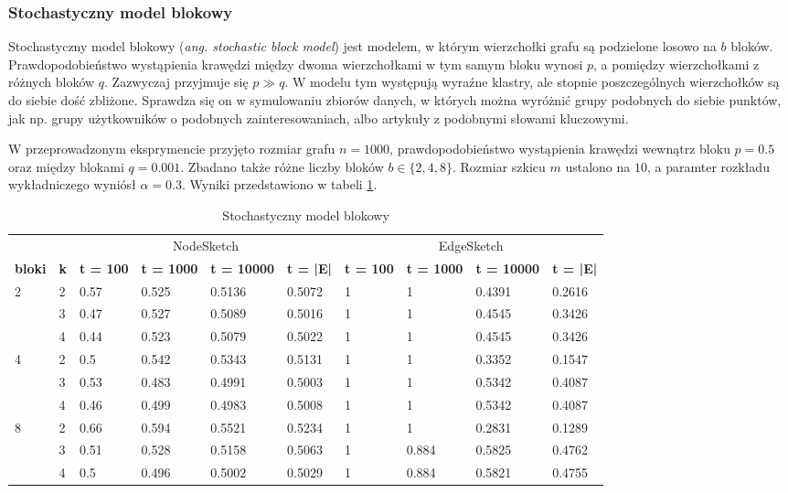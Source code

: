     \subsubsection{Stochastyczny model blokowy}
    Stochastyczny model blokowy (\emph{ang. stochastic block model}) jest modelem, w którym wierzchołki grafu są podzielone losowo na $b$ bloków. Prawdopodobieństwo wystąpienia krawędzi między dwoma wierzchołkami w tym samym bloku wynosi $p$, a pomiędzy wierzchołkami z różnych bloków $q$. Zazwyczaj przyjmuje się $p \gg q$. W modelu tym występują wyraźne klastry, ale stopnie poszczególnych wierzchołków są do siebie dość zbliżone. Sprawdza się on w symulowaniu zbiorów danych, w których można wyróżnić grupy podobnych do siebie punktów, jak np. grupy użytkowników o podobnych zainteresowaniach, albo artykuły z podobnymi słowami kluczowymi. 

    W przeprowadzonym eksprymencie przyjęto rozmiar grafu $n = 1000$, prawdopodobieństwo wystąpienia krawędzi wewnątrz bloku $p = 0.5$ oraz między blokami $q = 0.001$. Zbadano także różne liczby bloków $b \in \{2,4,8\}$. Rozmiar szkicu $m$ ustalono na $10$, a paramter rozkładu wykładniczego wyniósł $\alpha = 0.3$. Wyniki przedstawiono w tabeli \ref{tab:stochastic_block_model}.

    \begin{table}[!ht]
        \small
        \centering
        \begin{tabular}{|l|l|l|l|l|l|l|l|l|l|}
        \hline
            & & \multicolumn{4}{c|}{NodeSketch} & \multicolumn{4}{c|}{EdgeSketch} \\ \cline{1-10}
            \textbf{bloki} & \textbf{k} & \textbf{t = 100} & \textbf{t = 1000} & \textbf{t = 10000} & \textbf{t = |E|} & \textbf{t = 100} & \textbf{t = 1000} & \textbf{t = 10000} & \textbf{t = |E|} \\ \hline\hline
            \multirow{3}{*}{2} & 2 & 0.57 & 0.525 & 0.5136 & 0.5072 & 1 & 1 & 0.4391 & 0.2616 \\ \cline{2-10}
             & 3 & 0.47 & 0.527 & 0.5089 & 0.5016 & 1 & 1 & 0.4545 & 0.3426 \\ \cline{2-10}
             & 4 & 0.44 & 0.523 & 0.5079 & 0.5022 & 1 & 1 & 0.4545 & 0.3426 \\ \hline\hline
            \multirow{3}{*}{4} & 2 & 0.5 & 0.542 & 0.5343 & 0.5131 & 1 & 1 & 0.3352 & 0.1547 \\ \cline{2-10}
             & 3 & 0.53 & 0.483 & 0.4991 & 0.5003 & 1 & 1 & 0.5342 & 0.4087 \\ \cline{2-10}
             & 4 & 0.46 & 0.499 & 0.4983 & 0.5008 & 1 & 1 & 0.5342 & 0.4087 \\ \hline\hline
            \multirow{3}{*}{8} & 2 & 0.66 & 0.594 & 0.5521 & 0.5234 & 1 & 1 & 0.2831 & 0.1289 \\ \cline{2-10}
             & 3 & 0.51 & 0.528 & 0.5158 & 0.5063 & 1 & 0.884 & 0.5825 & 0.4762 \\ \cline{2-10}
             & 4 & 0.5 & 0.496 & 0.5002 & 0.5029 & 1 & 0.884 & 0.5821 & 0.4755 \\ \hline
        \end{tabular}
        \label{tab:stochastic_block_model}
        \caption{Stochastyczny model blokowy}
    \end{table}


